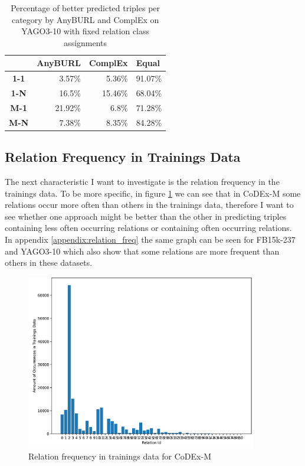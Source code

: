 \begin{table}[H]
\centering
\begin{tabular}{c|rrr}
\multicolumn{1}{l|}{} & \multicolumn{1}{c}{\textbf{AnyBURL}} & \multicolumn{1}{c}{\textbf{ComplEx}} & \multicolumn{1}{l}{\textbf{Equal}} \\ \hline
\textbf{1-1} & 3.57\% & 5.36\% & 91.07\% \\
\textbf{1-N} & 16.5\% & 15.46\% & 68.04\% \\
\textbf{M-1} & 21.92\% & 6.8\% & 71.28\% \\
\textbf{M-N} & 7.38\% & 8.35\% & 84.28\%
\end{tabular}
\caption{Percentage of better predicted triples per category by AnyBURL and ComplEx on YAGO3-10 with fixed relation class assignments}
\label{tab:relation_class_cleaned_anyburl_complex_yago}
\end{table}

\subsection{Relation Frequency in Trainings Data}
The next characteristic I want to investigate is the relation frequency in the trainings data. To be more specific, in figure \ref{fig:relation_freq_codex} we can see that in CoDEx-M some relations occur more often than others in the trainings data, therefore I want to see whether one approach might be better than the other in predicting triples containing less often occurring relations or containing often occurring relations. In appendix \ref{appendix:relation_freq} the same graph can be seen for FB15k-237 and YAGO3-10 which also show that some relations are more frequent than others in these datasets. 

\begin{figure}[H]
\centering
\includegraphics[width=0.9\textwidth]{images/relation_freq_codex.PNG}
\caption{Relation frequency in trainings data for CoDEx-M}
\label{fig:relation_freq_codex}
\end{figure}

